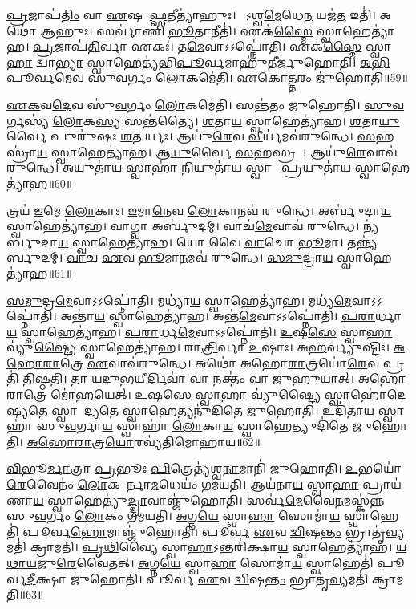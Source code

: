 \ul{𑌪𑍍𑌰}𑌜𑌾𑌪॑\ul{𑌤𑌿𑌂} 𑌵𑌾 \ul{𑌏}𑌷 𑌈᳚\ul{𑌫𑍍𑌸}𑌤𑍀𑌤𑍍𑌯𑌾॑𑌹𑍁𑌃।
𑌯𑍋᳚𑌽𑌶𑍍𑌵\ul{𑌮𑍇}𑌧𑍇\ul{𑌨} 𑌯𑌜॑\ul{𑌤} 𑌇𑌤𑌿॑।
𑌅𑌥𑍋॑ 𑌆𑌹𑍁𑌃।
𑌸𑌰𑍍𑌵𑌾॑𑌣𑌿 \ul{𑌭𑍂}𑌤𑌾𑌨𑍀𑌤𑌿॑।
𑌏𑌕॑\ul{𑌸𑍍𑌮𑍈} 𑌸𑍍𑌵𑌾𑌹𑍇𑌤𑍍𑌯𑌾॑𑌹।
\ul{𑌪𑍍𑌰}𑌜𑌾𑌪॑\ul{𑌤𑌿}𑌰𑍍𑌵𑌾 𑌏𑌕𑌃॑।
𑌤\ul{𑌮𑍇}𑌵𑌾𑌽𑌽𑌪𑍍𑌨𑍋॑𑌤𑌿।
𑌏𑌕॑\ul{𑌸𑍍𑌮𑍈} 𑌸𑍍𑌵𑌾\ul{𑌹𑌾} 𑌦𑍍𑌵𑌾\ul{𑌭𑍍𑌯𑌾}\ul{} 𑌸𑍍𑌵𑌾𑌹𑍇𑌤𑍍𑌯॑𑌭𑌿\ul{𑌪𑍂}𑌰𑍍𑌵𑌮𑌾𑌹𑍁॑𑌤𑍀𑌰𑍍𑌜𑍁𑌹𑍋𑌤𑌿।
\ul{𑌅}\ul{𑌭𑌿}\ul{𑌪𑍂}𑌰𑍍𑌵\ul{𑌮𑍇}𑌵 𑌸𑍁॑\ul{𑌵}𑌰𑍍𑌗𑌂 \ul{𑌲𑍋}𑌕𑌮𑍇॑𑌤𑌿।
\ul{𑌏}\ul{𑌕𑍋}\ul{𑌤𑍍𑌤}𑌰𑌂 𑌜𑍁॑𑌹𑍋𑌤𑌿॥59॥

\ul{𑌏}\ul{𑌕}𑌵\ul{𑌦𑍇}𑌵 𑌸𑍁॑\ul{𑌵}𑌰𑍍𑌗𑌂 \ul{𑌲𑍋}𑌕𑌮𑍇॑𑌤𑌿।
𑌸𑌨𑍍𑌤॑𑌤𑌂 𑌜𑍁𑌹𑍋𑌤𑌿।
\ul{𑌸𑍁}\ul{𑌵}𑌰𑍍𑌗𑌸𑍍𑌯॑ \ul{𑌲𑍋}𑌕\ul{𑌸𑍍𑌯} 𑌸𑌨𑍍𑌤॑𑌤𑍍𑌯𑍈।
\ul{𑌶}𑌤𑌾\ul{𑌯} 𑌸𑍍𑌵𑌾𑌹𑍇𑌤𑍍𑌯𑌾॑𑌹।
\ul{𑌶}𑌤𑌾\ul{𑌯𑍁}𑌰𑍍𑌵𑍈 𑌪𑍁𑌰𑍁॑𑌷𑌃 \ul{𑌶}𑌤𑌵𑍀᳚𑌰𑍍𑌯𑌃।
𑌆𑌯𑍁॑\ul{𑌰𑍇}𑌵 \ul{𑌵𑍀}𑌰𑍍𑌯॑𑌮𑌵॑𑌰𑍁𑌨𑍍𑌧𑍇।
\ul{𑌸}𑌹𑌸𑍍𑌰𑌾॑\ul{𑌯} 𑌸𑍍𑌵𑌾𑌹𑍇𑌤𑍍𑌯𑌾॑𑌹।
𑌆\ul{𑌯𑍁}𑌰𑍍𑌵𑍈 \ul{𑌸}𑌹𑌸𑍍𑌰𑌮𑍍᳚।
𑌆𑌯𑍁॑\ul{𑌰𑍇}𑌵𑌾𑌵॑ 𑌰𑍁𑌨𑍍𑌧𑍇।
\ul{𑌅}𑌯𑍁𑌤𑌾॑\ul{𑌯} 𑌸𑍍𑌵𑌾𑌹𑌾॑ \ul{𑌨𑌿}𑌯𑍁𑌤𑌾॑\ul{𑌯} 𑌸𑍍𑌵𑌾𑌹𑌾᳚ \ul{𑌪𑍍𑌰}𑌯𑍁𑌤𑌾॑\ul{𑌯} 𑌸𑍍𑌵𑌾𑌹𑍇𑌤𑍍𑌯𑌾॑𑌹॥60॥

𑌤𑍍𑌰𑌯॑ \ul{𑌇}𑌮𑍇 \ul{𑌲𑍋}𑌕𑌾𑌃।
\ul{𑌇}𑌮𑌾\ul{𑌨𑍇}𑌵 \ul{𑌲𑍋}𑌕𑌾𑌨𑌵॑ 𑌰𑍁𑌨𑍍𑌧𑍇।
𑌅𑌰𑍍𑌬𑍁॑𑌦𑌾\ul{𑌯} 𑌸𑍍𑌵𑌾𑌹𑍇𑌤𑍍𑌯𑌾॑𑌹।
𑌵𑌾𑌗𑍍𑌵𑌾 𑌅𑌰𑍍𑌬𑍁॑𑌦𑌮𑍍।
𑌵𑌾𑌚॑\ul{𑌮𑍇}𑌵𑌾𑌵॑ 𑌰𑍁𑌨𑍍𑌧𑍇।
𑌨𑍍𑌯॑𑌰𑍍𑌬𑍁𑌦𑌾\ul{𑌯} 𑌸𑍍𑌵𑌾𑌹𑍇𑌤𑍍𑌯𑌾॑𑌹।
𑌯𑍋 𑌵𑍈 \ul{𑌵𑌾}𑌚𑍋 \ul{𑌭𑍂}𑌮𑌾।
𑌤𑌨𑍍𑌨𑍍𑌯॑𑌰𑍍𑌬𑍁𑌦𑌮𑍍।
\ul{𑌵𑌾}𑌚 \ul{𑌏}𑌵 \ul{𑌭𑍂}𑌮𑌾\ul{𑌨}𑌮𑌵॑ 𑌰𑍁𑌨𑍍𑌧𑍇।
\ul{𑌸}\ul{𑌮𑍁}𑌦𑍍𑌰𑌾\ul{𑌯} 𑌸𑍍𑌵𑌾𑌹𑍇𑌤𑍍𑌯𑌾॑𑌹॥61॥

\ul{𑌸}\ul{𑌮𑍁}𑌦𑍍𑌰\ul{𑌮𑍇}𑌵𑌾𑌽𑌽𑌪𑍍𑌨𑍋॑𑌤𑌿।
𑌮𑌧𑍍𑌯𑌾॑\ul{𑌯} 𑌸𑍍𑌵𑌾𑌹𑍇𑌤𑍍𑌯𑌾॑𑌹।
𑌮𑌧𑍍𑌯॑\ul{𑌮𑍇}𑌵𑌾𑌽𑌽𑌪𑍍𑌨𑍋॑𑌤𑌿।
𑌅𑌨𑍍𑌤𑌾॑\ul{𑌯} 𑌸𑍍𑌵𑌾𑌹𑍇𑌤𑍍𑌯𑌾॑𑌹।
𑌅𑌨𑍍𑌤॑\ul{𑌮𑍇}𑌵𑌾𑌽𑌽𑌪𑍍𑌨𑍋॑𑌤𑌿।
\ul{𑌪}\ul{𑌰𑌾}𑌰𑍍𑌧𑌾\ul{𑌯} 𑌸𑍍𑌵𑌾𑌹𑍇𑌤𑍍𑌯𑌾॑𑌹।
\ul{𑌪}\ul{𑌰𑌾}𑌰𑍍𑌧\ul{𑌮𑍇}𑌵𑌾𑌽𑌽𑌪𑍍𑌨𑍋॑𑌤𑌿।
\ul{𑌉}𑌷\ul{𑌸𑍇} 𑌸𑍍𑌵𑌾\ul{𑌹𑌾} 𑌵𑍍𑌯𑍁॑\ul{𑌷𑍍𑌟𑍍𑌯𑍈} 𑌸𑍍𑌵𑌾𑌹𑍇𑌤𑍍𑌯𑌾॑𑌹।
𑌰𑌾\ul{𑌤𑍍𑌰𑌿}𑌰𑍍𑌵𑌾 \ul{𑌉}𑌷𑌾𑌃।
𑌅\ul{𑌹}𑌰𑍍𑌵𑍍𑌯𑍁॑𑌷𑍍𑌟𑌿𑌃।
\ul{𑌅}\ul{𑌹𑍋}\ul{𑌰𑌾}𑌤𑍍𑌰𑍇 \ul{𑌏}𑌵𑌾𑌵॑𑌰𑍁𑌨𑍍𑌧𑍇।
𑌅𑌥𑍋॑ 𑌅𑌹𑍋\ul{𑌰𑌾}𑌤𑍍𑌰𑌯𑍋॑\ul{𑌰𑍇}𑌵 𑌪𑍍𑌰𑌤𑌿॑ 𑌤𑌿𑌷𑍍𑌠𑌤𑌿।
𑌤𑌾 𑌯\ul{𑌦𑍁}𑌭\ul{𑌯𑍀}𑌰𑍍𑌦𑌿𑌵𑌾॑ \ul{𑌵𑌾} 𑌨𑌕𑍍𑌤𑌂॑ 𑌵𑌾 𑌜𑍁\ul{𑌹𑍁}𑌯𑌾𑌤𑍍।
\ul{𑌅}\ul{𑌹𑍋}\ul{𑌰𑌾}𑌤𑍍𑌰𑍇 𑌮𑍋॑𑌹𑌯𑍇𑌤𑍍।
\ul{𑌉}𑌷\ul{𑌸𑍇} 𑌸𑍍𑌵𑌾\ul{𑌹𑌾} 𑌵𑍍𑌯𑍁॑\ul{𑌷𑍍𑌟𑍍𑌯𑍈} 𑌸𑍍𑌵𑌾𑌹𑍋॑𑌦𑍇\ul{𑌷𑍍𑌯}𑌤𑍇 𑌸𑍍𑌵𑌾𑌹𑍋᳚\ul{𑌦𑍍𑌯}𑌤𑍇 𑌸𑍍𑌵𑌾𑌹𑍇𑌤𑍍𑌯𑌨𑍁॑𑌦𑌿𑌤𑍇 𑌜𑍁𑌹𑍋𑌤𑌿।
𑌉𑌦𑌿॑𑌤𑌾\ul{𑌯} 𑌸𑍍𑌵𑌾𑌹𑌾॑ 𑌸𑍁\ul{𑌵}𑌰𑍍𑌗𑌾\ul{𑌯} 𑌸𑍍𑌵𑌾𑌹𑌾॑ \ul{𑌲𑍋}𑌕𑌾\ul{𑌯} 𑌸𑍍𑌵𑌾𑌹𑍇𑌤𑍍𑌯𑍁𑌦𑌿॑𑌤𑍇 𑌜𑍁𑌹𑍋𑌤𑌿।
\ul{𑌅}\ul{𑌹𑍋}\ul{𑌰𑌾}𑌤𑍍𑌰\ul{𑌯𑍋}𑌰𑌵𑍍𑌯॑𑌤𑌿𑌮𑍋𑌹𑌾𑌯॥62॥\anuvakamend[\ul{𑌏}\ul{𑌕𑍋}\ul{𑌤𑍍𑌤}𑌰𑌂 𑌜𑍁॑𑌹𑍋𑌤𑌿 \ul{𑌪𑍍𑌰}𑌯𑍁𑌤𑌾॑\ul{𑌯} 𑌸𑍍𑌵𑌾𑌹𑍇𑌤𑍍𑌯𑌾॑𑌹 𑌸\ul{𑌮𑍁}𑌦𑍍𑌰𑌾\ul{𑌯} 𑌸𑍍𑌵𑌾𑌹𑍇\ul{𑌤𑍍𑌯𑌾}𑌹𑌾\ul{𑌹}𑌰𑍍𑌵𑍍𑌯𑍁॑𑌷𑍍𑌟𑌿𑌃 \ul{𑌸}𑌪𑍍𑌤 𑌚॑]

\ul{𑌵𑌿}𑌭𑍂\ul{𑌰𑍍𑌮𑌾}𑌤𑍍𑌰𑌾 \ul{𑌪𑍍𑌰}𑌭𑍂𑌃 \ul{𑌪𑌿}𑌤𑍍𑌰𑍇𑌤𑍍𑌯॑𑌶𑍍𑌵\ul{𑌨𑌾}𑌮𑌾𑌨𑌿॑ 𑌜𑍁𑌹𑍋𑌤𑌿।
\ul{𑌉}𑌭𑌯𑍋॑\ul{𑌰𑍇}𑌵𑍈𑌨𑌂॑ \ul{𑌲𑍋}𑌕𑌯𑍋᳚𑌰𑍍𑌨𑌾\ul{𑌮}𑌧𑍇𑌯𑌂॑ 𑌗𑌮𑌯𑌤𑌿।
𑌆𑌯॑𑌨𑌾\ul{𑌯} 𑌸𑍍𑌵𑌾\ul{𑌹𑌾} 𑌪𑍍𑌰𑌾𑌯॑𑌣𑌾\ul{𑌯} 𑌸𑍍𑌵𑌾𑌹𑍇𑌤𑍍𑌯𑍁॑\ul{𑌦𑍍𑌦𑍍𑌰𑌾}𑌵𑌾𑌞𑍍𑌜𑍁॑𑌹𑍋𑌤𑌿।
𑌸𑌰𑍍𑌵॑\ul{𑌮𑍇}𑌵𑍈\ul{𑌨}𑌮𑌸𑍍𑌕॑𑌨𑍍𑌨 𑌸𑍁\ul{𑌵}𑌰𑍍𑌗𑌂 \ul{𑌲𑍋}𑌕𑌂 𑌗॑𑌮𑌯𑌤𑌿।
\ul{𑌅}𑌗𑍍𑌨\ul{𑌯𑍇} 𑌸𑍍𑌵𑌾\ul{𑌹𑌾} 𑌸𑍋𑌮𑌾॑\ul{𑌯} 𑌸𑍍𑌵𑌾𑌹𑍇𑌤𑌿॑ 𑌪𑍂𑌰𑍍𑌵\ul{𑌹𑍋}𑌮𑌾𑌞𑍍𑌜𑍁॑𑌹𑍋𑌤𑌿।
𑌪𑍂𑌰𑍍𑌵॑ \ul{𑌏}𑌵 \ul{𑌦𑍍𑌵𑌿}𑌷\ul{𑌨𑍍𑌤𑌂} 𑌭𑍍𑌰𑌾𑌤𑍃॑\ul{𑌵𑍍𑌯}𑌮𑌤𑌿॑ 𑌕𑍍𑌰𑌾𑌮𑌤𑌿।
\ul{𑌪𑍃}\ul{𑌥𑌿}𑌵𑍍𑌯𑍈 𑌸𑍍𑌵𑌾\ul{𑌹𑌾}\-𑌽𑌨𑍍𑌤𑌰𑌿॑𑌕𑍍𑌷𑌾\ul{𑌯} 𑌸𑍍𑌵𑌾𑌹𑍇𑌤𑍍𑌯𑌾॑𑌹।
\ul{𑌯}\ul{𑌥𑌾}\ul{𑌯}𑌜𑍁\ul{𑌰𑍇}𑌵𑍈𑌤𑌤𑍍।
\ul{𑌅}𑌗𑍍𑌨\ul{𑌯𑍇} 𑌸𑍍𑌵𑌾\ul{𑌹𑌾} 𑌸𑍋𑌮𑌾॑\ul{𑌯} 𑌸𑍍𑌵𑌾𑌹𑍇𑌤𑌿॑ 𑌪𑍂𑌰𑍍𑌵\ul{𑌦𑍀}𑌕𑍍𑌷𑌾 𑌜𑍁॑𑌹𑍋𑌤𑌿।
𑌪𑍂𑌰𑍍𑌵॑ \ul{𑌏}𑌵 \ul{𑌦𑍍𑌵𑌿}𑌷\ul{𑌨𑍍𑌤𑌂} 𑌭𑍍𑌰𑌾𑌤𑍃॑\ul{𑌵𑍍𑌯}𑌮𑌤𑌿॑ 𑌕𑍍𑌰𑌾𑌮𑌤𑌿॥63॥

